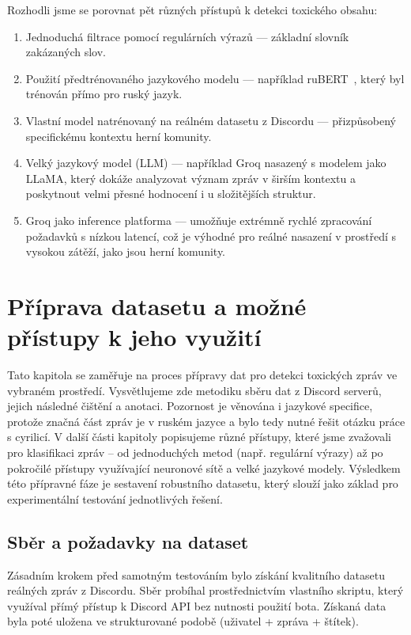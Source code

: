 \documentclass[FM,Proj]{tulthesis}
\begin{document}
Rozhodli jsme se porovnat pět různých přístupů k detekci toxického obsahu:

\begin{enumerate}
    \item Jednoduchá filtrace pomocí regulárních výrazů — základní slovník zakázaných slov.
    \item Použití předtrénovaného jazykového modelu — například ruBERT \cite{kuratov2019adaptationdeepbidirectionalmultilingual}, který byl trénován přímo pro ruský jazyk.
    \item Vlastní model natrénovaný na reálném datasetu z Discordu — přizpůsobený specifickému kontextu herní komunity.
    \item Velký jazykový model (LLM) — například Groq nasazený s modelem jako LLaMA, který dokáže analyzovat význam zpráv v širším kontextu a poskytnout velmi přesné hodnocení i u složitějších struktur.
    \item Groq jako inference platforma — umožňuje extrémně rychlé zpracování požadavků s nízkou latencí, což je výhodné pro reálné nasazení v prostředí s vysokou zátěží, jako jsou herní komunity.
\end{enumerate}

\chapter{Příprava datasetu a možné přístupy k jeho využití}
Tato kapitola se zaměřuje na proces přípravy dat pro detekci toxických zpráv ve vybraném prostředí. Vysvětlujeme zde metodiku sběru dat z Discord serverů, jejich následné čištění a anotaci. Pozornost je věnována i jazykové specifice, protože značná část zpráv je v ruském jazyce a bylo tedy nutné řešit otázku práce s cyrilicí. V další části kapitoly popisujeme různé přístupy, které jsme zvažovali pro klasifikaci zpráv – od jednoduchých metod (např. regulární výrazy) až po pokročilé přístupy využívající neuronové sítě a velké jazykové modely. Výsledkem této přípravné fáze je sestavení robustního datasetu, který slouží jako základ pro experimentální testování jednotlivých řešení.
\section{Sběr a požadavky na dataset}\label{deklarace}
Zásadním krokem před samotným testováním bylo získání kvalitního datasetu reálných zpráv z Discordu. Sběr probíhal prostřednictvím vlastního skriptu, který využíval přímý přístup k Discord API bez nutnosti použití bota. Získaná data byla poté uložena ve strukturované podobě (uživatel + zpráva + štítek).
\end{document}
